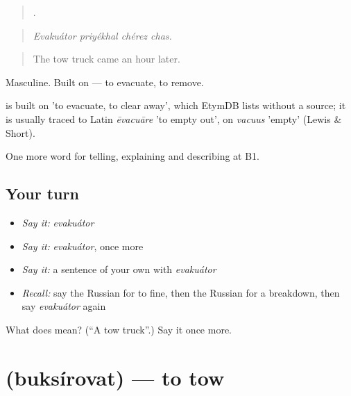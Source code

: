 \begin{quote}
   .
\end{quote}

\begin{quote}
\emph{Evakuátor priyékhal chérez chas.}
\end{quote}

\begin{quote}
The tow truck came an hour later.
\end{quote}

Masculine. Built on \emph{} — to evacuate, to remove.

\begin{cousinweb}
\emph{} is built on \emph{} 'to evacuate, to clear away', which EtymDB lists without a source; it is usually traced to Latin \emph{ēvacuāre} 'to empty out', on \emph{vacuus} 'empty' (Lewis \& Short).
\end{cousinweb}

\begin{grammarlens}[title={What you've built}]
One more word for telling, explaining and describing at B1.
\end{grammarlens}

\subsection*{Your turn}
\begin{itemize}
\raggedright
  \item \emph{Say it:} \emph{evakuátor}
  \item \emph{Say it:} \emph{evakuátor}, once more
  \item \emph{Say it:} a sentence of your own with \emph{evakuátor}
  \item \emph{Recall:} say the Russian for to fine, then the Russian for a breakdown, then say \emph{evakuátor} again
\end{itemize}

\begin{tcolorbox}[breakable,colback=teal!4,colframe=teal!35!black,title={Before you move on}]
What does  mean? (\textquotedblleft{}A tow truck\textquotedblright{}.) Say it once more.
\end{tcolorbox}
\section[\texorpdfstring{\ru{буксировать} (buksírovat)}{буксировать (buksírovat)}]{ (buksírovat) — to tow}

